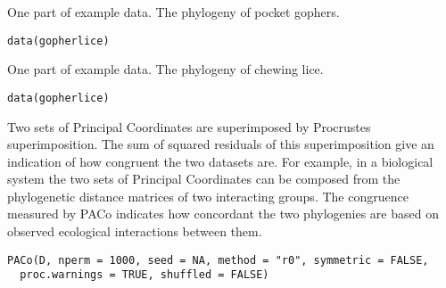 \documentclass[letterpaper]{book}
\begin{document}
%
\begin{Description}\relax
One part of example data. The phylogeny of pocket gophers.
\end{Description}
%
\begin{Usage}
\begin{verbatim}
data(gopherlice)
\end{verbatim}
\end{Usage}
%
\begin{Description}\relax
One part of example data. The phylogeny of chewing lice.
\end{Description}
%
\begin{Usage}
\begin{verbatim}
data(gopherlice)
\end{verbatim}
\end{Usage}
%
\begin{Description}\relax
Two sets of Principal Coordinates are superimposed by Procrustes superimposition. The sum of squared residuals of this superimposition give an indication of how congruent the two datasets are. For example, in a biological system the two sets of Principal Coordinates can be composed from the phylogenetic distance matrices of two interacting groups. The congruence measured by PACo indicates how concordant the two phylogenies are based on observed ecological interactions between them.
\end{Description}
%
\begin{Usage}
\begin{verbatim}
PACo(D, nperm = 1000, seed = NA, method = "r0", symmetric = FALSE,
  proc.warnings = TRUE, shuffled = FALSE)
\end{verbatim}
\end{Usage}
%
\end{document}

